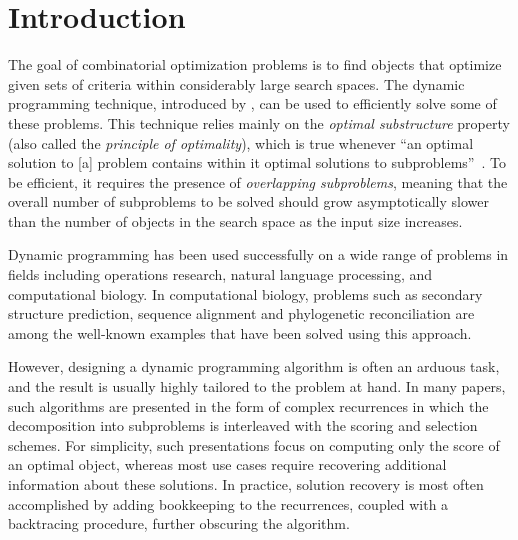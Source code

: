 
\section{Introduction}

The goal of combinatorial optimization problems is to find objects that optimize given sets of criteria within considerably large search spaces.
The dynamic programming technique, introduced by \textcite{Bellman1957DynamicProgramming}, can be used to efficiently solve some of these problems.
This technique relies mainly on the \emph{optimal substructure} property (also called the \emph{principle of optimality}), which is true whenever \enquote{an optimal solution to [a] problem contains within it optimal solutions to subproblems}~\parencite[§14.3]{Cormen2022IntroductionAlgorithms}.
To be efficient, it requires the presence of \emph{overlapping subproblems}, meaning that the overall number of subproblems to be solved should grow asymptotically slower than the number of objects in the search space as the input size increases.

Dynamic programming has been used successfully on a wide range of problems in fields including operations research, natural language processing, and computational biology.
In computational biology, problems such as secondary structure prediction, sequence alignment and phylogenetic reconciliation are among the well-known examples that have been solved using this approach.

However, designing a dynamic programming algorithm is often an arduous task, and the result is usually highly tailored to the problem at hand.
In many papers, such algorithms are presented in the form of complex recurrences in which the decomposition into subproblems is interleaved with the scoring and selection schemes.
For simplicity, such presentations focus on computing only the score of an optimal object, whereas most use cases require recovering additional information about these solutions.
In practice, solution recovery is most often accomplished by adding bookkeeping to the recurrences, coupled with a backtracing procedure, further obscuring the algorithm.




